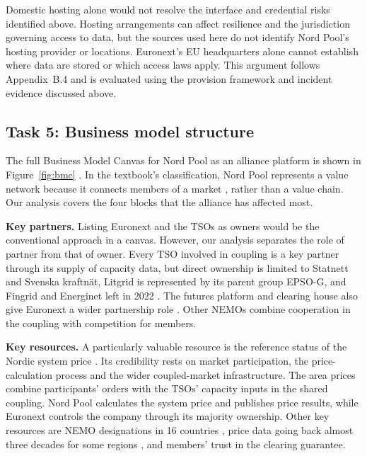 Domestic hosting alone would not resolve the interface and credential risks identified above. Hosting arrangements can affect resilience and the jurisdiction governing access to data, but the sources used here do not identify Nord Pool's hosting provider or locations. Euronext's EU headquarters alone cannot establish where data are stored or which access laws apply. This argument follows Appendix~B.4 and is evaluated using the provision framework and incident evidence discussed above.

\subsection{Task 5: Business model structure}
\label{sec:t5}

The full Business Model Canvas for Nord Pool as an alliance platform is shown in Figure~\ref{fig:bmc} \citep[Section~19.2]{OverbyAudestad2021}. In the textbook's classification, Nord Pool represents a value network because it connects members of a market \citep[Def.~8.3]{OverbyAudestad2021}, rather than a value chain. Our analysis covers the four blocks that the alliance has affected most.

\textbf{Key partners.} Listing Euronext and the TSOs as owners would be the conventional approach in a canvas. However, our analysis separates the role of partner from that of owner. Every TSO involved in coupling is a key partner through its supply of capacity data, but direct ownership is limited to Statnett and Svenska kraftnät, Litgrid is represented by its parent group EPSO-G, and Fingrid and Energinet left in 2022 \citep{EPSOG2022Completed}. The futures platform and clearing house also give Euronext a wider partnership role \citep{Euronext2026}. Other NEMOs combine cooperation in the coupling with competition for members.

\textbf{Key resources.} A particularly valuable resource is the reference status of the Nordic system price \citep{NPPrice}. Its credibility rests on market participation, the price-calculation process and the wider coupled-market infrastructure. The area prices combine participants' orders with the TSOs' capacity inputs in the shared coupling. Nord Pool calculates the system price and publishes price results, while Euronext controls the company through its majority ownership. Other key resources are NEMO designations in 16 countries \citep{NP2024}, price data going back almost three decades for some regions \citep{NPData}, and members' trust in the clearing guarantee.


